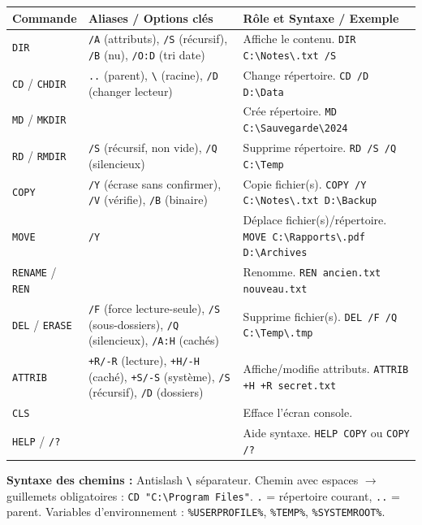 \documentclass[11pt]{article}
\begin{document}
\begin{propriete}
\begin{center}
\begin{tabularx}{\linewidth}{|l|l|X|}\hline
\rowcolor{popblueL} \textbf{Commande} & \textbf{Aliases / Options clés} & \textbf{Rôle et Syntaxe / Exemple} \\\hline
\texttt{DIR} & \texttt{/A} (attributs), \texttt{/S} (récursif), \texttt{/B} (nu), \texttt{/O:D} (tri date) & Affiche le contenu. \texttt{DIR C:\textbackslash Notes\textbackslash *.txt /S} \\\hline
\texttt{CD} / \texttt{CHDIR} & \texttt{..} (parent), \texttt{\textbackslash} (racine), \texttt{/D} (changer lecteur) & Change répertoire. \texttt{CD /D D:\textbackslash Data} \\\hline
\texttt{MD} / \texttt{MKDIR} & & Crée répertoire. \texttt{MD C:\textbackslash Sauvegarde\textbackslash 2024} \\\hline
\texttt{RD} / \texttt{RMDIR} & \texttt{/S} (récursif, non vide), \texttt{/Q} (silencieux) & Supprime répertoire. \texttt{RD /S /Q C:\textbackslash Temp} \\\hline
\texttt{COPY} & \texttt{/Y} (écrase sans confirmer), \texttt{/V} (vérifie), \texttt{/B} (binaire) & Copie fichier(s). \texttt{COPY /Y C:\textbackslash Notes\textbackslash *.txt D:\textbackslash Backup} \\\hline
\texttt{MOVE} & \texttt{/Y} & Déplace fichier(s)/répertoire. \texttt{MOVE C:\textbackslash Rapports\textbackslash *.pdf D:\textbackslash Archives} \\\hline
\texttt{RENAME} / \texttt{REN} & & Renomme. \texttt{REN ancien.txt nouveau.txt} \\\hline
\texttt{DEL} / \texttt{ERASE} & \texttt{/F} (force lecture-seule), \texttt{/S} (sous-dossiers), \texttt{/Q} (silencieux), \texttt{/A:H} (cachés) & Supprime fichier(s). \texttt{DEL /F /Q C:\textbackslash Temp\textbackslash *.tmp} \\\hline
\texttt{ATTRIB} & \texttt{+R/-R} (lecture), \texttt{+H/-H} (caché), \texttt{+S/-S} (système), \texttt{/S} (récursif), \texttt{/D} (dossiers) & Affiche/modifie attributs. \texttt{ATTRIB +H +R secret.txt} \\\hline
\texttt{CLS} & & Efface l'écran console. \\\hline
\texttt{HELP} / \texttt{/?} & & Aide syntaxe. \texttt{HELP COPY} ou \texttt{COPY /?} \\\hline
\end{tabularx}
\end{center}

\textbf{Syntaxe des chemins :} Antislash \texttt{\textbackslash} séparateur. Chemin avec espaces $\rightarrow$ guillemets obligatoires : \texttt{CD "C:\textbackslash Program Files"}. \texttt{.} = répertoire courant, \texttt{..} = parent. Variables d'environnement : \texttt{\%USERPROFILE\%}, \texttt{\%TEMP\%}, \texttt{\%SYSTEMROOT\%}.
\end{propriete}
\end{document}
